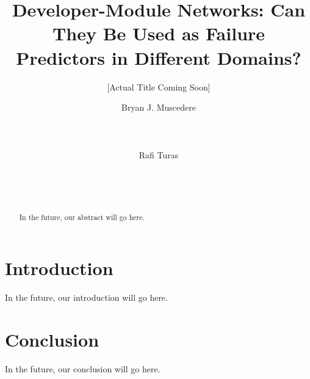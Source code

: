 \documentclass{sig-alternate-05-2015}
\begin{document}

\title{Developer-Module Networks: Can They Be Used as Failure Predictors in Different Domains?}
\subtitle{[Actual Title Coming Soon]}


\author{
\alignauthor
Bryan J. Muscedere\\
       \\
       \\
       \\
\alignauthor
Rafi Turas\\
       \\
       \\
       \\
       }
\maketitle

\begin{abstract}
In the future, our abstract will go here.
\end{abstract}

\section{Introduction}
In the future, our introduction will go here.


\section{Conclusion}
In the future, our conclusion will go here.




\end{document}
